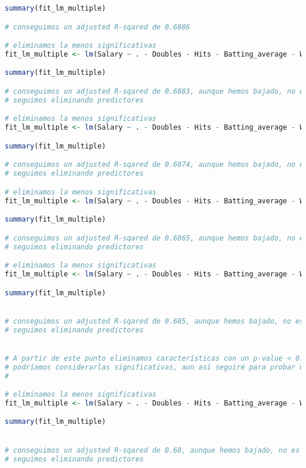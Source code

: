 \begin{lstlisting}[language=R]
summary(fit_lm_multiple)

# conseguimos un adjusted R-sqared de 0.6886

# eliminamos la menos significativas
fit_lm_multiple <- lm(Salary ~ . - Doubles - Hits - Batting_average - Walks - `On-base_percentage` - Triples, data = baseball)

summary(fit_lm_multiple)

# conseguimos un adjusted R-sqared de 0.6883, aunque hemos bajado, no es nada significativo
# seguimos eliminando predictores

# eliminamos la menos significativas
fit_lm_multiple <- lm(Salary ~ . - Doubles - Hits - Batting_average - Walks - `On-base_percentage` - Triples - Arbitration, data = baseball)

summary(fit_lm_multiple)

# conseguimos un adjusted R-sqared de 0.6874, aunque hemos bajado, no es nada significativo
# seguimos eliminando predictores

# eliminamos la menos significativas
fit_lm_multiple <- lm(Salary ~ . - Doubles - Hits - Batting_average - Walks - `On-base_percentage` - Triples - Arbitration - Errors, data = baseball)

summary(fit_lm_multiple)

# conseguimos un adjusted R-sqared de 0.6865, aunque hemos bajado, no es nada significativo
# seguimos eliminando predictores

# eliminamos la menos significativas
fit_lm_multiple <- lm(Salary ~ . - Doubles - Hits - Batting_average - Walks - `On-base_percentage` - Triples - Arbitration - Errors - Runs, data = baseball)

summary(fit_lm_multiple)


# conseguimos un adjusted R-sqared de 0.685, aunque hemos bajado, no es nada significativo
# seguimos eliminando predictores


# A partir de este punto eliminamos características con un p-value < 0.05, por lo que
# podríamos considerarlas significativas, aun así seguiré para probar un modelo simple
#

# eliminamos la menos significativas
fit_lm_multiple <- lm(Salary ~ . - Doubles - Hits - Batting_average - Walks - `On-base_percentage` - Triples - Arbitration - Errors - Runs - Free_agent, data = baseball)

summary(fit_lm_multiple)


# conseguimos un adjusted R-sqared de 0.68, aunque hemos bajado, no es nada significativo
# seguimos eliminando predictores



\end{lstlisting}
